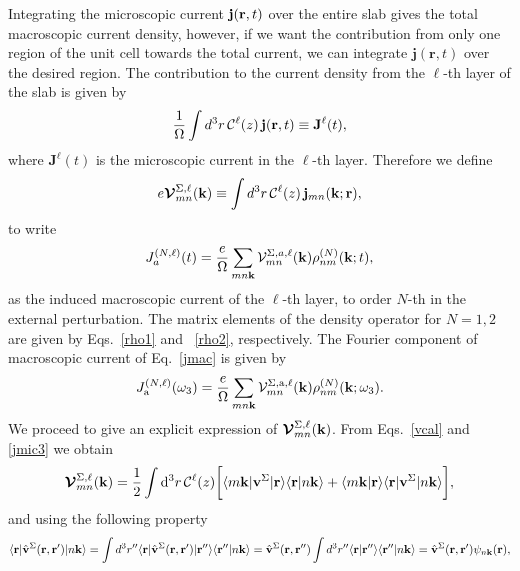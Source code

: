 \documentclass[floatfix,prb,aps,superscriptaddress,11pt,preprint]{revtex4}
\begin{document}
Integrating the microscopic current $\mathbf{j}(\mathbf{r},t)$ over
the entire slab gives the total macroscopic current density, 
 however, if we want the
contribution from only one region of the unit cell towards the total
current, we can integrate $\mathbf{j}({\mathbf r},t)$ over the
desired region. The contribution to the current density from the
$\ell$-th layer of the slab is given by
\begin{equation}\label{jsz}
\frac{1}{\Omega}\int d^3r\, {\mathbf{\cal C}}^\ell(z)\, \mathbf{j}(\mathbf{r},t)
 \equiv \mathbf{J}^{\ell}(t),
\end{equation}
where $\mathbf{J}^{\ell}(t)$ is the microscopic current  in the
$\ell$-th layer.
Therefore we define
\begin{equation}\label{vcal}
e{\boldsymbol{\mathcal{V}}}^{\Sigma,\ell}_{mn}(\mathbf{k})
\equiv
\int d^3r\, {\mathbf{\cal C}}^\ell(z)\,\mathbf{j}_{mn}({\mathbf{k}};\mathbf{r}),
\end{equation}
to write
\begin{equation}\label{jmac}
J_a^{(N,\ell)}(t)=\frac{e}{\Omega}
\sum_{mn\mathbf{k}}
\mathcal{V}^{\Sigma,a,\ell}_{mn}(\mathbf{k})
\rho^{(N)}_{nm}(\mathbf{k};t),
\end{equation}
as the induced macroscopic current of the  $\ell$-th layer,
 to order $N$-th in the external
perturbation.
 The matrix elements of the
density operator for $N=1,2$ are given by Eqs.~\eqref{rho1} and
~\eqref{rho2}, respectively. 
The Fourier component of macroscopic current of Eq.~\eqref{jmac} is given by
\begin{equation}\label{jmac2}
J_{\mathrm{a}}^{(N,\ell)}(\omega_3)=\frac{e}{\Omega}
\sum_{mn\mathbf{k}}
{\mathbf{\cal V}}^{\Sigma,\mathrm{a},\ell}_{mn}(\mathbf{k})
\rho^{(N)}_{nm}(\mathbf{k};\omega_3)
.
\end{equation}
We proceed to give an explicit expression of
$\boldsymbol{\mathcal{\cal V}}^{\Sigma,\ell}_{mn}(\mathbf{k})$.
From
Eqs.~\eqref{vcal} and \eqref{jmic3} we obtain
\begin{equation}\label{intj}
{\boldsymbol{\mathcal{V}}}^{\Sigma,\ell}_{mn}({\mathbf k})=
\frac{1}{2}
\int \mathrm{d}^3 r\,
 {\mathbf{\cal C}}^\ell(z)
\bigg[
\langle m\mathbf{k}|\mathbf{v}^\Sigma | \mathbf{r}\rangle
\langle \mathbf{r} | n \mathbf k \rangle +
\langle m\mathbf{k} | \mathbf{r}\rangle
\langle \mathbf{r} | \mathbf{v}^\Sigma | n \mathbf k \rangle\bigg]
,
\end{equation}  
and using the following property
\begin{equation}\label{nl.2}
\langle \mathbf{r} | \hat{\mathbf{v}}^\Sigma(\mathbf{r},\mathbf{r}')| n\mathbf{k} \rangle
=\int d^3 r'' \langle \mathbf{r} |\hat{\mathbf{v}}^\Sigma(\mathbf{r},\mathbf{r}')| \mathbf{r}'' \rangle
\langle {\mathbf{r}''} | {n\mathbf{k}} \rangle
=\hat{\mathbf{v}}^\Sigma(\mathbf{r},\mathbf{r}'')
\int d^3 r'' \langle {\mathbf{r}} | {\mathbf{r}''} \rangle
\langle {\mathbf{r}''} | {n\mathbf{k}} \rangle
=\hat{\mathbf{v}}^\Sigma(\mathbf{r},\mathbf{r}')
\psi_{n\mathbf{k}}(\mathbf{r})
,
\end{equation}
\end{document}
